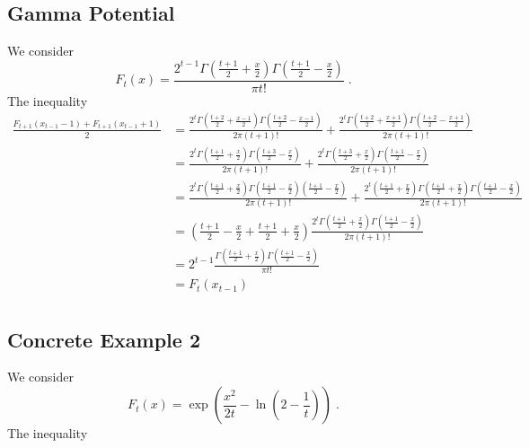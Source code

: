 \subsection{Gamma Potential}

We consider
$$
F_t(x) = \frac{2^{t-1} \Gamma(\frac{t+1}{2} + \frac{x}{2})\Gamma(\frac{t+1}{2} - \frac{x}{2})}{\pi t!} \; .
$$
The inequality
\begin{align*}
\frac{F_{t+1}(x_{t-1} - 1) + F_{t+1}(x_{t-1} + 1)}{2}
& = \frac{2^t \Gamma(\frac{t+2}{2} + \frac{x-1}{2})\Gamma(\frac{t+2}{2} - \frac{x-1}{2})}{2\pi (t+1)!} + \frac{2^t \Gamma(\frac{t+2}{2} + \frac{x+1}{2})\Gamma(\frac{t+2}{2} - \frac{x+1}{2})}{2\pi (t+1)!} \\
& = \frac{2^t \Gamma(\frac{t+1}{2} + \frac{x}{2})\Gamma(\frac{t+3}{2} - \frac{x}{2})}{2\pi (t+1)!} + \frac{2^t \Gamma(\frac{t+3}{2} + \frac{x}{2})\Gamma(\frac{t+1}{2} - \frac{x}{2})}{2\pi (t+1)!} \\
& = \frac{2^t \Gamma(\frac{t+1}{2} + \frac{x}{2})\Gamma(\frac{t+1}{2} - \frac{x}{2})(\frac{t+1}{2} - \frac{x}{2})}{2\pi (t+1)!} + \frac{2^t (\frac{t+1}{2} + \frac{x}{2})\Gamma(\frac{t+1}{2} + \frac{x}{2})\Gamma(\frac{t+1}{2} - \frac{x}{2})}{2\pi (t+1)!} \\
& = \left( \frac{t+1}{2} - \frac{x}{2} + \frac{t+1}{2} + \frac{x}{2} \right) \frac{2^t \Gamma(\frac{t+1}{2} + \frac{x}{2})\Gamma(\frac{t+1}{2} - \frac{x}{2})}{2\pi (t+1)!} \\
& = 2^{t-1} \frac{\Gamma(\frac{t+1}{2} + \frac{x}{2})\Gamma(\frac{t+1}{2} - \frac{x}{2})}{\pi t!} \\
& = F_t(x_{t-1}) \\
\end{align*}


\subsection{Concrete Example 2}

We consider
$$
F_t(x) = \exp\left( \frac{x^2}{2t} - \ln\left(2 - \frac{1}{t} \right) \right) \; .
$$
The inequality
